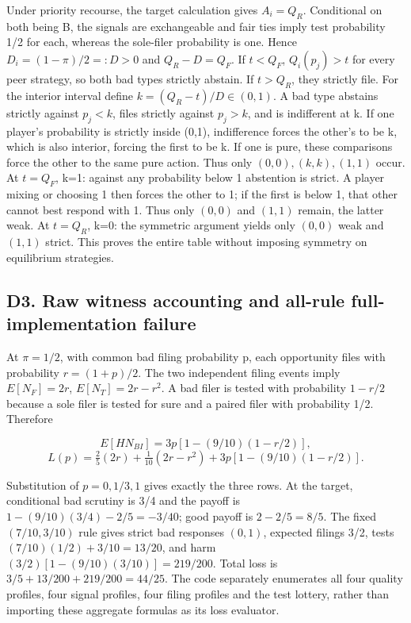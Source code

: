 \documentclass[
  11pt,
]{article}
\begin{document}
Under priority recourse, the target calculation gives \(A_i=Q_R\).
Conditional on both being B, the signals are exchangeable and fair ties
imply test probability 1/2 for each, whereas the sole-filer probability
is one. Hence \(D_i=(1-\pi)/2=:D>0\) and \(Q_R-D=Q_F\). If \(t<Q_F\),
\(Q_i(p_j)>t\) for every peer strategy, so both bad types strictly
abstain. If \(t>Q_R\), they strictly file. For the interior interval
define \(k=(Q_R-t)/D\in(0,1)\). A bad type abstains strictly against
\(p_j<k\), files strictly against \(p_j>k\), and is indifferent at k. If
one player's probability is strictly inside (0,1), indifference forces
the other's to be k, which is also interior, forcing the first to be k.
If one is pure, these comparisons force the other to the same pure
action. Thus only \((0,0),(k,k),(1,1)\) occur. At \(t=Q_F\), k=1:
against any probability below 1 abstention is strict. A player mixing or
choosing 1 then forces the other to 1; if the first is below 1, that
other cannot best respond with 1. Thus only \((0,0)\) and \((1,1)\)
remain, the latter weak. At \(t=Q_R\), k=0: the symmetric argument
yields only \((0,0)\) weak and \((1,1)\) strict. This proves the entire
table without imposing symmetry on equilibrium strategies.

\subsection{D3. Raw witness accounting and all-rule full-implementation
failure}\label{d3.-raw-witness-accounting-and-all-rule-full-implementation-failure}

At \(\pi=1/2\), with common bad filing probability p, each opportunity
files with probability \(r=(1+p)/2\). The two independent filing events
imply \(E[N_F]=2r\), \(E[N_T]=2r-r^2\). A bad filer is tested with
probability \(1-r/2\) because a sole filer is tested for sure and a
paired filer with probability 1/2. Therefore

\[E[H N_{BI}]=3p[1-(9/10)(1-r/2)],\]
\[L(p)=\tfrac25(2r)+\tfrac1{10}(2r-r^2)+3p[1-(9/10)(1-r/2)].\]

Substitution of \(p=0,1/3,1\) gives exactly the three rows. At the
target, conditional bad scrutiny is 3/4 and the payoff is
\(1-(9/10)(3/4)-2/5=-3/40\); good payoff is \(2-2/5=8/5\). The fixed
\((7/10,3/10)\) rule gives strict bad responses \((0,1)\), expected
filings 3/2, tests \((7/10)(1/2)+3/10=13/20\), and harm
\((3/2)[1-(9/10)(3/10)]=219/200\). Total loss is
\(3/5+13/200+219/200=44/25\). The code separately enumerates all four
quality profiles, four signal profiles, four filing profiles and the
test lottery, rather than importing these aggregate formulas as its loss
evaluator.
\end{document}
